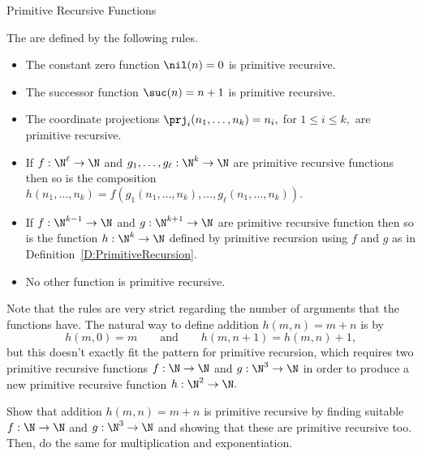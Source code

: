 \begin{unit}{Primitive Recursive Functions}
\begin{definition}\label{D:PrimitiveRecursive}
  The  are defined by the following rules.
  \begin{itemize}
  \item The constant zero function \(\nil(n) = 0\) is primitive recursive.
  \item The successor function \(\suc(n) = n+1\) is primitive recursive.
  \item The coordinate projections \(\prj_i(n_1,\dots,n_k) = n_i,\) for \(1 \leq i \leq k,\) are primitive recursive.
  \item If \(f:\N^\ell\to\N\) and \(g_1,\dots,g_\ell:\N^k\to\N\) are primitive recursive functions then so is the composition \(h(n_1,\dots,n_k) = f(g_1(n_1,\dots,n_k),\dots,g_\ell(n_1,\dots,n_k)).\)
  \item If \(f:\N^{k-1}\to\N\) and \(g:\N^{k+1}\to\N\) are primitive recursive function then so is the function \(h:\N^k\to\N\) defined by primitive recursion using \(f\) and \(g\) as in Definition~\ref{D:PrimitiveRecursion}.
  \item No other function is primitive recursive.
  \end{itemize}
\end{definition}

\noindent
Note that the rules are very strict regarding the number of arguments that the functions have.
The natural way to define addition \(h(m,n) = m + n\) is by \[h(m,0) = m \qquad\text{and}\qquad h(m,n+1) = h(m,n)+1,\] but this doesn't exactly fit the pattern for primitive recursion, which requires two primitive recursive functions \(f:\N\to\N\) and \(g:\N^3\to\N\) in order to produce a new primitive recursive function \(h:\N^2\to\N.\)

\begin{problem}
  Show that addition \(h(m,n) = m + n\) is primitive recursive by finding suitable \(f:\N\to\N\) and \(g:\N^3\to\N\) and showing that these are primitive recursive too.
  Then, do the same for multiplication and exponentiation.
\end{problem}


\end{unit}
